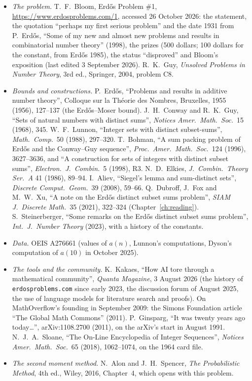 \begin{itemize}
\item \emph{The problem.} T.~F.~Bloom, Erd\H os Problem \#1, \url{https://www.erdosproblems.com/1}, accessed 26 October 2026: the statement, the
quotation ``perhaps my first serious problem'' and the date 1931 from P.~Erd\H os, ``Some of my new and almost new problems and results in combinatorial
number theory'' (1998), the prizes (500 dollars; 100 dollars for the constant, from Erd\H os 1985), the status ``disproved'' and Bloom's exposition
(last edited 3 September 2026). R.~K.~Guy, \emph{Unsolved Problems in Number Theory}, 3rd ed., Springer, 2004, problem C8.
\item \emph{Bounds and constructions.} P.~Erd\H os, ``Problems and results in additive number theory'', Colloque sur la Th\'eorie des Nombres, Bruxelles,
1955 (1956), 127--137 (the Erd\H os--Moser bound). J.~H.~Conway and R.~K.~Guy, ``Sets of natural numbers with distinct sums'', \emph{Notices Amer.\ Math.\
Soc.}\ 15 (1968), 345. W.~F.~Lunnon, ``Integer sets with distinct subset-sums'', \emph{Math.\ Comp.}\ 50 (1988), 297--320. T.~Bohman, ``A sum packing problem of
Erd\H os and the Conway--Guy sequence'', \emph{Proc.\ Amer.\ Math.\ Soc.}\ 124 (1996), 3627--3636, and ``A construction for sets of integers with distinct subset sums'',
\emph{Electron.\ J.\ Combin.}\ 5 (1998), R3. N.~D.~Elkies, \emph{J.\ Combin.\ Theory Ser.~A} 41 (1986), 89--94. I.~Aliev, ``Siegel's lemma and sum-distinct sets'',
\emph{Discrete Comput.\ Geom.}\ 39 (2008), 59--66. Q.~Dubroff, J.~Fox and M.~W.~Xu, ``A note on the Erd\H os distinct subset sums problem'', \emph{SIAM J.\ Discrete Math.}\
35 (2021), 322--324 (Chapter~\ref{ch:reading}). S.~Steinerberger, ``Some remarks on the Erd\H os distinct subset sums problem'', \emph{Int.\ J.\ Number Theory} (2023), with a history of
the constants.
\item \emph{Data.} OEIS A276661 (values of $a(n)$, Lunnon's computations, Dyson's computation of $a(10)$ in October 2025).
\item \emph{The tools and the community.} K.~Kakaes, ``How AI tore through a mathematical community'', \emph{Quanta Magazine}, 3 August 2026 (the history of
\texttt{erdosproblems.com} since early 2023, the discussion forum of August 2025, the use of language models for literature search and proofs).
On MathOverflow's founding in September 2009: the Simons Foundation article ``The Global Math Commons'' (2011). P.~Ginsparg, ``It was twenty years ago
today\ldots'', arXiv:1108.2700 (2011), on the arXiv's start in August 1991. N.~J.~A.~Sloane, ``The On-Line Encyclopedia of Integer Sequences'', \emph{Notices Amer.\
Math.\ Soc.}\ 65 (2018), 1062--1074, on the 1964 card file.
\item \emph{The second moment method.} N.~Alon and J.~H.~Spencer, \emph{The Probabilistic Method}, 4th ed., Wiley, 2016, Chapter~4, which opens with this
problem.
\end{itemize}
